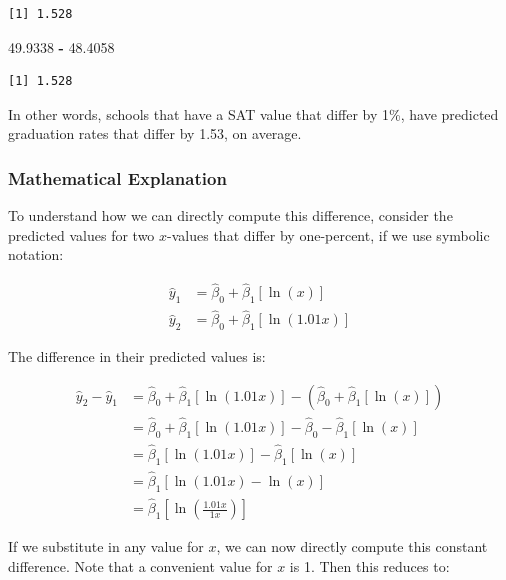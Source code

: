 \documentclass[]{book}
\newenvironment{Shaded}{\begin{snugshade}}{\end{snugshade}}
\newcommand{\FloatTok}[1]{\textcolor[rgb]{0.00,0.00,0.81}{#1}}
\newcommand{\OperatorTok}[1]{\textcolor[rgb]{0.81,0.36,0.00}{\textbf{#1}}}
\newcommand{\StringTok}[1]{\textcolor[rgb]{0.31,0.60,0.02}{#1}}
\begin{document}
\begin{verbatim}
[1] 1.528
\end{verbatim}

\begin{Shaded}
\begin{Highlighting}[]
\FloatTok{49.9338} \OperatorTok{-}\StringTok{ }\FloatTok{48.4058}
\end{Highlighting}
\end{Shaded}

\begin{verbatim}
[1] 1.528
\end{verbatim}

In other words, schools that have a SAT value that differ by 1\%, have predicted graduation rates that differ by 1.53, on average.

\hypertarget{mathematical-explanation}{%
\subsubsection{Mathematical Explanation}\label{mathematical-explanation}}

To understand how we can directly compute this difference, consider the predicted values for two \(x\)-values that differ by one-percent, if we use symbolic notation:

\[
\begin{split}
\hat{y}_1 &= \hat\beta_0 + \hat\beta_1\left[\ln(x)\right] \\
\hat{y}_2 &= \hat\beta_0 + \hat\beta_1\left[\ln(1.01x)\right]
\end{split}
\]

The difference in their predicted values is:

\[
\begin{split}
\hat{y}_2 - \hat{y}_1 &= \hat\beta_0 + \hat\beta_1\left[\ln(1.01x)\right] - \left(\hat\beta_0 + \hat\beta_1\left[\ln(x)\right]\right) \\
&=\hat\beta_0 + \hat\beta_1\left[\ln(1.01x)\right] - \hat\beta_0 - \hat\beta_1\left[\ln(x)\right] \\
&=\hat\beta_1\left[\ln(1.01x)\right] - \hat\beta_1\left[\ln(x)\right] \\
&=\hat\beta_1\left[\ln(1.01x) - \ln(x)\right]\\
&=\hat\beta_1\left[\ln(\frac{1.01x}{1x})\right]
\end{split}
\]

If we substitute in any value for \(x\), we can now directly compute this constant difference. Note that a convenient value for \(x\) is 1. Then this reduces to:
\end{document}
